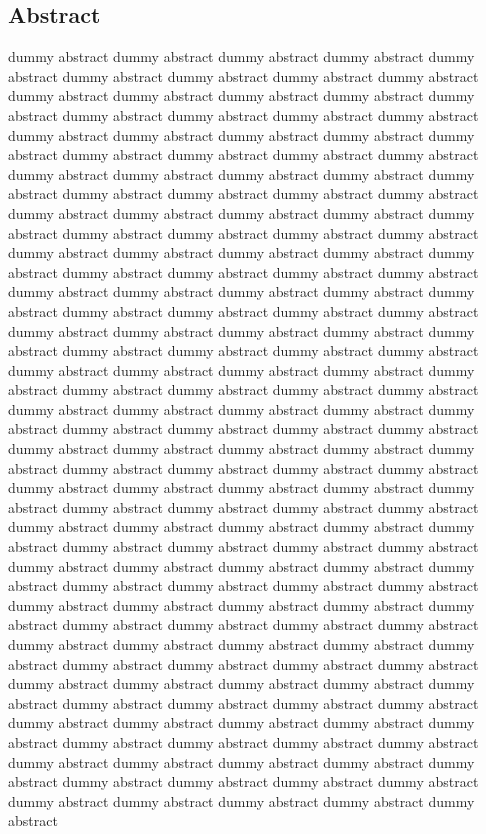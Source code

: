 {}
\vspace*{15em}

\begin{center}
    \section*{Abstract}
    
		dummy abstract dummy abstract dummy abstract dummy abstract dummy abstract dummy abstract dummy abstract dummy abstract dummy abstract dummy abstract dummy abstract dummy abstract dummy abstract dummy abstract dummy abstract dummy abstract
		dummy abstract dummy abstract dummy abstract dummy abstract dummy abstract dummy abstract dummy abstract dummy abstract dummy abstract dummy abstract dummy abstract dummy abstract dummy abstract dummy abstract dummy abstract dummy abstract
		dummy abstract dummy abstract dummy abstract dummy abstract dummy abstract dummy abstract dummy abstract dummy abstract dummy abstract dummy abstract dummy abstract dummy abstract dummy abstract dummy abstract dummy abstract dummy abstract
		dummy abstract dummy abstract dummy abstract dummy abstract dummy abstract dummy abstract dummy abstract dummy abstract dummy abstract dummy abstract dummy abstract dummy abstract dummy abstract dummy abstract dummy abstract dummy abstract
		dummy abstract dummy abstract dummy abstract dummy abstract dummy abstract dummy abstract dummy abstract dummy abstract dummy abstract dummy abstract dummy abstract dummy abstract dummy abstract dummy abstract dummy abstract dummy abstract
		dummy abstract dummy abstract dummy abstract dummy abstract dummy abstract dummy abstract dummy abstract dummy abstract dummy abstract dummy abstract dummy abstract dummy abstract dummy abstract dummy abstract dummy abstract dummy abstract
		dummy abstract dummy abstract dummy abstract dummy abstract dummy abstract dummy abstract dummy abstract dummy abstract dummy abstract dummy abstract dummy abstract dummy abstract dummy abstract dummy abstract dummy abstract dummy abstract
		dummy abstract dummy abstract dummy abstract dummy abstract dummy abstract dummy abstract dummy abstract dummy abstract dummy abstract dummy abstract dummy abstract dummy abstract dummy abstract dummy abstract dummy abstract dummy abstract
		dummy abstract dummy abstract dummy abstract dummy abstract dummy abstract dummy abstract dummy abstract dummy abstract dummy abstract dummy abstract dummy abstract dummy abstract dummy abstract dummy abstract dummy abstract dummy abstract
		dummy abstract dummy abstract dummy abstract dummy abstract dummy abstract dummy abstract dummy abstract dummy abstract dummy abstract dummy abstract dummy abstract dummy abstract dummy abstract dummy abstract dummy abstract dummy abstract
		dummy abstract dummy abstract dummy abstract dummy abstract dummy abstract dummy abstract dummy abstract dummy abstract dummy abstract dummy abstract dummy abstract dummy abstract dummy abstract dummy abstract dummy abstract dummy abstract

\end{center}


{}

\newpage